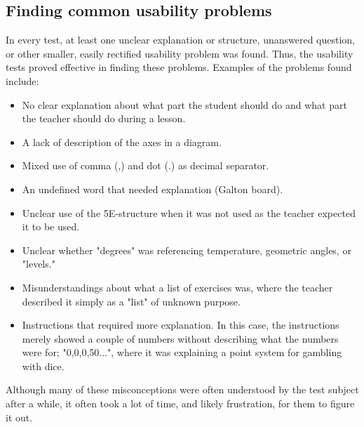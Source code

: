 \subsection{Finding common usability problems}
In every test, at least one unclear explanation or structure, unanswered question, or other smaller, easily rectified usability problem was found. Thus, the usability tests proved effective in finding these problems. Examples of the problems found include:
\begin{itemize}
	\item No clear explanation about what part the student should do and what part the teacher should do during a lesson.
	\item A lack of description of the axes in a diagram.
	\item Mixed use of comma (,) and dot (.) as decimal separator.
	\item An undefined word that needed explanation (Galton board).
	\item Unclear use of the 5E-structure when it was not used as the teacher expected it to be used.
	\item Unclear whether "degrees" was referencing temperature, geometric angles, or "levels."
	\item Misunderstandings about what a list of exercises was, where the teacher described it simply as a "list" of unknown purpose.
	\item Instructions that required more explanation. In this case, the instructions merely showed a couple of numbers without describing what the numbers were for; "0,0,0,50...", where it was explaining a point system for gambling with dice.
\end{itemize}

Although many of these misconceptions were often understood by the test subject after a while, it often took a lot of time, and likely frustration, for them to figure it out.
